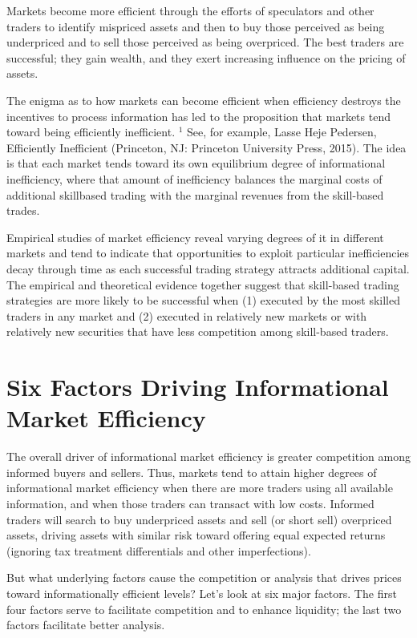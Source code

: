 \documentclass[11pt]{article}
\begin{document}
Markets become more efficient through the efforts of speculators and other traders to identify mispriced assets and then to buy those perceived as being underpriced and to sell those perceived as being overpriced. The best traders are successful; they gain wealth, and they exert increasing influence on the pricing of assets.

The enigma as to how markets can become efficient when efficiency destroys the incentives to process information has led to the proposition that markets tend toward being efficiently inefficient. ${ }^{1}$ See, for example, Lasse Heje Pedersen, Efficiently Inefficient (Princeton, NJ: Princeton University Press, 2015). The idea is that each market tends toward its own equilibrium degree of informational inefficiency, where that amount of inefficiency balances the marginal costs of additional skillbased trading with the marginal revenues from the skill-based trades.

Empirical studies of market efficiency reveal varying degrees of it in different markets and tend to indicate that opportunities to exploit particular inefficiencies decay through time as each successful trading strategy attracts additional capital. The empirical and theoretical evidence together suggest that skill-based trading strategies are more likely to be successful when (1) executed by the most skilled traders in any market and (2) executed in relatively new markets or with relatively new securities that have less competition among skill-based traders.

\section*{Six Factors Driving Informational Market Efficiency}
The overall driver of informational market efficiency is greater competition among informed buyers and sellers. Thus, markets tend to attain higher degrees of informational market efficiency when there are more traders using all available information, and when those traders can transact with low costs. Informed traders will search to buy underpriced assets and sell (or short sell) overpriced assets, driving assets with similar risk toward offering equal expected returns (ignoring tax treatment differentials and other imperfections).

But what underlying factors cause the competition or analysis that drives prices toward informationally efficient levels? Let's look at six major factors. The first four factors serve to facilitate competition and to enhance liquidity; the last two factors facilitate better analysis.
\end{document}
